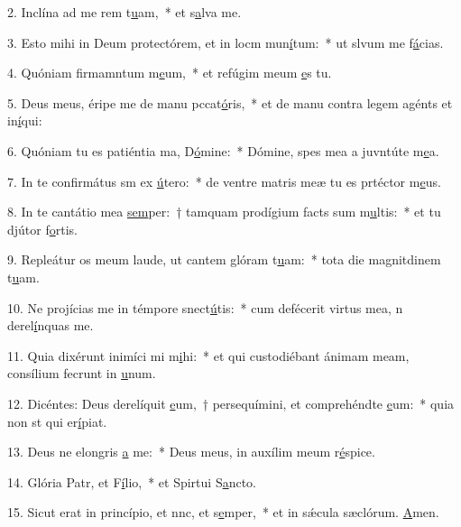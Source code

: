 2. Inclína ad me rem t\uline{u}am,~* et s\uline{a}lva me.\par 
3. Esto mihi in Deum protectórem, et in locm mun\uline{í}tum:~* ut slvum me f\uline{á}cias.\par 
4. Quóniam firmamntum m\uline{e}um,~* et refúgim meum \uline{e}s tu.\par 
5. Deus meus, éripe me de manu pccat\uline{ó}ris,~* et de manu contra legem agénts et in\uline{í}qui:\par 
6. Quóniam tu es patiéntia ma, D\uline{ó}mine:~* Dómine, spes mea a juvntúte m\uline{e}a.\par 
7. In te confirmátus sm ex \uline{ú}tero:~* de ventre matris meæ tu es prtéctor m\uline{e}us.\par 
8. In te cantátio mea \uline{sem}per:~† tamquam prodígium facts sum m\uline{u}ltis:~* et tu djútor f\uline{o}rtis.\par 
9. Repleátur os meum laude, ut cantem glóram t\uline{u}am:~* tota die magnitdinem t\uline{u}am.\par 
10. Ne projícias me in témpore snect\uline{ú}tis:~* cum defécerit virtus mea, n derel\uline{í}nquas me.\par 
11. Quia dixérunt inimíci mi m\uline{i}hi:~* et qui custodiébant ánimam meam, consílium fecrunt in \uline{u}num.\par 
12. Dicéntes: Deus derelíquit \uline{e}um,~† persequímini, et comprehéndte \uline{e}um:~* quia non st qui er\uline{í}piat.\par 
13. Deus ne elongris \uline{a} me:~* Deus meus, in auxílim meum r\uline{é}spice.\par 
14. Glória Patr, et F\uline{í}lio,~* et Spirtui S\uline{a}ncto.\par 
15. Sicut erat in princípio, et nnc, et s\uline{e}mper,~* et in sǽcula sæclórum. \uline{A}men.\par 
